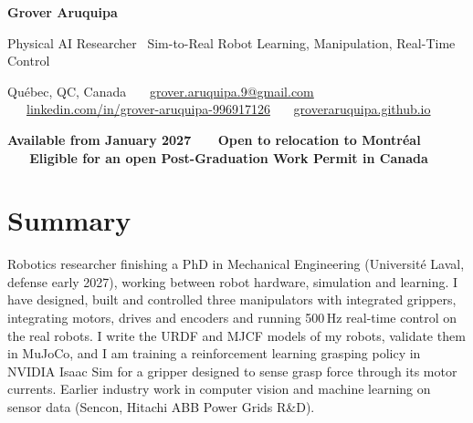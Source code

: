 \documentclass[10pt,letterpaper]{article}
\begin{document}
{\LARGE\bfseries Grover Aruquipa}\par\vspace{2pt}
{\large Physical AI Researcher \textbar\ Sim-to-Real Robot Learning, Manipulation, Real-Time Control}\par\vspace{3pt}
{\small Qu\'ebec, QC, Canada \ \textbullet\ \
\href{mailto:grover.aruquipa.9@gmail.com}{grover.aruquipa.9@gmail.com} \ \textbullet\ \
\href{https://www.linkedin.com/in/grover-aruquipa-996917126}{linkedin.com/in/grover-aruquipa-996917126} \ \textbullet\ \
\href{https://groveraruquipa.github.io}{groveraruquipa.github.io}}\par\vspace{1pt}
{\small\bfseries Available from January 2027 \ \textbullet\ \ Open to relocation to Montr\'eal \ \textbullet\ \ Eligible for an open Post-Graduation Work Permit in Canada}\par

\section{Summary}
Robotics researcher finishing a PhD in Mechanical Engineering (Universit\'e Laval, defense early 2027), working between
robot hardware, simulation and learning. I have designed, built and controlled three manipulators with integrated grippers,
integrating motors, drives and encoders and running 500\,Hz real-time control on the real robots. I write the URDF and MJCF
models of my robots, validate them in MuJoCo, and I am training a reinforcement learning grasping policy in NVIDIA Isaac Sim
for a gripper designed to sense grasp force through its motor currents. Earlier industry work in computer vision and machine
learning on sensor data (Sencon, Hitachi ABB Power Grids R\&D).

\end{document}

